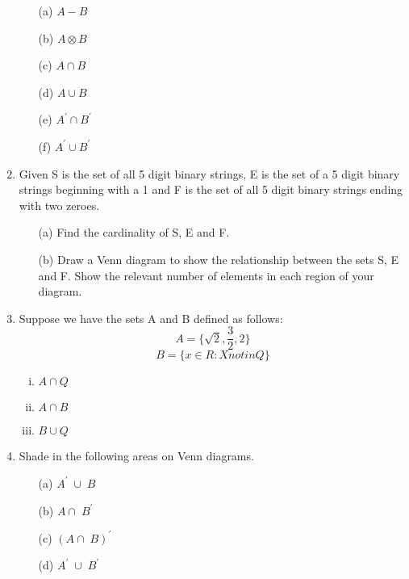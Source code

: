 \documentclass[]{article}
\begin{document}
\begin{enumerate}
\begin{multicols}{2}
\begin{itemize}
\item[(a)] $A-B$
\item[(b)] $A \otimes B$
\item[(c)] $A \cap B$
\item[(d)] $A \cup B$
\item[(e)] $A^{\prime} \cap B^{\prime}$
\item[(f)] $A^{\prime} \cup B^{\prime}$
\end{itemize}
\end{multicols}


\item Given S is the set of all 5 digit binary strings, E is the set of a 5 digit
binary strings beginning with a 1 and F is the set of all 5 digit binary strings ending
with two zeroes.
\begin{itemize}
\item[(a)] Find the cardinality of S, E and F.
\item[(b)] Draw a Venn diagram to show the relationship between the sets S, E and F.
Show the relevant number of elements in each region of your diagram.
\end{itemize}


\item Suppose we have the sets A and B defined as follows:
\[ A = \{ \sqrt{2}, \frac{3}{2}, 2 \}\]
\[  B = \{ x \in R :  X not in Q \}  \]


\begin{enumerate}[(i)]
\item $A \cap Q$
\item $A \cap B$
\item $B \cup Q$
\end{enumerate}


\item Shade in the following areas on Venn diagrams.

\begin{multicols}{2}
\begin{itemize}

\item[(a)] $A^\prime\; \cup\; B$

\item[(b)] $A \cap\; B^\prime\;$

\item[(c)] $(A \cap\; B)^\prime\;$

\item[(d)] $A^\prime\; \cup\; B^\prime\;$


\end{itemize}
\end{multicols}
\end{enumerate}
\end{document}
